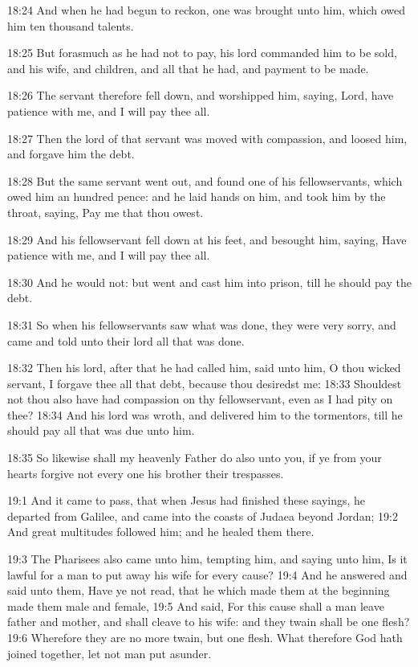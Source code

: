 18:24 And when he had begun to reckon, one was brought unto him, which
owed him ten thousand talents.

18:25 But forasmuch as he had not to pay, his lord commanded him to be
sold, and his wife, and children, and all that he had, and payment to
be made.

18:26 The servant therefore fell down, and worshipped him, saying,
Lord, have patience with me, and I will pay thee all.

18:27 Then the lord of that servant was moved with compassion, and
loosed him, and forgave him the debt.

18:28 But the same servant went out, and found one of his
fellowservants, which owed him an hundred pence: and he laid hands on
him, and took him by the throat, saying, Pay me that thou owest.

18:29 And his fellowservant fell down at his feet, and besought him,
saying, Have patience with me, and I will pay thee all.

18:30 And he would not: but went and cast him into prison, till he
should pay the debt.

18:31 So when his fellowservants saw what was done, they were very
sorry, and came and told unto their lord all that was done.

18:32 Then his lord, after that he had called him, said unto him, O
thou wicked servant, I forgave thee all that debt, because thou
desiredst me: 18:33 Shouldest not thou also have had compassion on thy
fellowservant, even as I had pity on thee?  18:34 And his lord was
wroth, and delivered him to the tormentors, till he should pay all
that was due unto him.

18:35 So likewise shall my heavenly Father do also unto you, if ye
from your hearts forgive not every one his brother their trespasses.

19:1 And it came to pass, that when Jesus had finished these sayings,
he departed from Galilee, and came into the coasts of Judaea beyond
Jordan; 19:2 And great multitudes followed him; and he healed them
there.

19:3 The Pharisees also came unto him, tempting him, and saying unto
him, Is it lawful for a man to put away his wife for every cause?
19:4 And he answered and said unto them, Have ye not read, that he
which made them at the beginning made them male and female, 19:5 And
said, For this cause shall a man leave father and mother, and shall
cleave to his wife: and they twain shall be one flesh?  19:6 Wherefore
they are no more twain, but one flesh. What therefore God hath joined
together, let not man put asunder.

